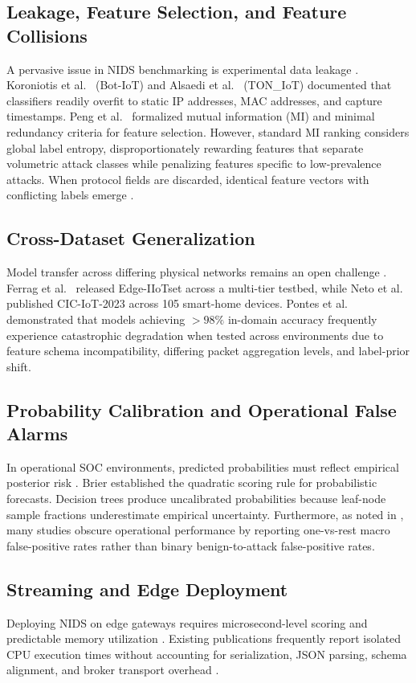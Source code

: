\documentclass[10pt,journal,twocolumn]{IEEEtran}
\begin{document}
\subsection{Leakage, Feature Selection, and Feature Collisions}
A pervasive issue in NIDS benchmarking is experimental data leakage \cite{ref6,ref7}. Koroniotis et al.\ \cite{ref6} (Bot-IoT) and Alsaedi et al.\ \cite{ref7} (TON\_IoT) documented that classifiers readily overfit to static IP addresses, MAC addresses, and capture timestamps. Peng et al.\ \cite{ref16} formalized mutual information (MI) and minimal redundancy criteria for feature selection. However, standard MI ranking considers global label entropy, disproportionately rewarding features that separate volumetric attack classes while penalizing features specific to low-prevalence attacks. When protocol fields are discarded, identical feature vectors with conflicting labels emerge \cite{ref22}.

\subsection{Cross-Dataset Generalization}
Model transfer across differing physical networks remains an open challenge \cite{ref10}. Ferrag et al.\ \cite{ref1} released Edge-IIoTset across a multi-tier testbed, while Neto et al.\ \cite{ref2} published CIC-IoT-2023 across 105 smart-home devices. Pontes et al.\ \cite{ref10} demonstrated that models achieving $>98\%$ in-domain accuracy frequently experience catastrophic degradation when tested across environments due to feature schema incompatibility, differing packet aggregation levels, and label-prior shift.

\subsection{Probability Calibration and Operational False Alarms}
In operational SOC environments, predicted probabilities must reflect empirical posterior risk \cite{ref21}. Brier \cite{ref21} established the quadratic scoring rule for probabilistic forecasts. Decision trees produce uncalibrated probabilities because leaf-node sample fractions underestimate empirical uncertainty. Furthermore, as noted in \cite{ref5}, many studies obscure operational performance by reporting one-vs-rest macro false-positive rates rather than binary benign-to-attack false-positive rates.

\subsection{Streaming and Edge Deployment}
Deploying NIDS on edge gateways requires microsecond-level scoring and predictable memory utilization \cite{ref8,ref24}. Existing publications frequently report isolated CPU execution times without accounting for serialization, JSON parsing, schema alignment, and broker transport overhead \cite{ref24}.
\end{document}

